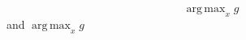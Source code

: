 \documentclass{article}
\DeclareMathOperator*{\argmax}{arg\,max}
\begin{document}
\[\argmax_x g\] and $\argmax_x g$
\end{document}
